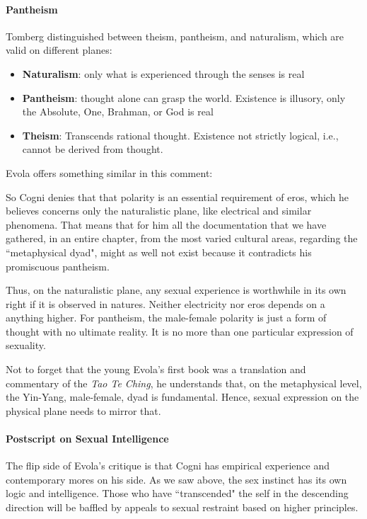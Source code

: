 \paragraph{Pantheism}
Tomberg distinguished between theism, pantheism, and naturalism, which are valid on different planes:

\begin{itemize}
\item \textbf{Naturalism}: only what is experienced through the senses is real 
\item \textbf{Pantheism}: thought alone can grasp the world. Existence is illusory, only the Absolute, One, Brahman, or God is real 
\item \textbf{Theism}: Transcends rational thought. Existence not strictly logical, i.e., cannot be derived from thought. 
\end{itemize}
Evola offers something similar in this comment:

\begin{quotex}
So Cogni denies that that polarity is an essential requirement of eros, which he believes concerns only the naturalistic plane, like electrical and similar phenomena. That means that for him all the documentation that we have gathered, in an entire chapter, from the most varied cultural areas, regarding the ``metaphysical dyad", might as well not exist because it contradicts his promiscuous pantheism. 

\end{quotex}
Thus, on the naturalistic plane, any sexual experience is worthwhile in its own right if it is observed in natures. Neither electricity nor eros depends on a anything higher. For pantheism, the male-female polarity is just a form of thought with no ultimate reality. It is no more than one particular expression of sexuality.

Not to forget that the young Evola's first book was a translation and commentary of the \emph{Tao Te Ching}, he understands that, on the metaphysical level, the Yin-Yang, male-female, dyad is fundamental. Hence, sexual expression on the physical plane needs to mirror that.

\paragraph{Postscript on Sexual Intelligence}
The flip side of Evola's critique is that Cogni has empirical experience and contemporary mores on his side. As we saw above, the sex instinct has its own logic and intelligence. Those who have ``transcended" the self in the descending direction will be baffled by appeals to sexual restraint based on higher principles.

